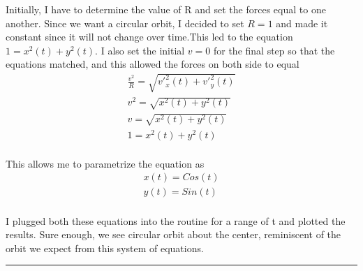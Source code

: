 \documentclass[11pt]{article}
\begin{document}
\noindent Initially, I have to determine the value of R and set the forces equal to one another. Since we want a circular orbit, I decided to set $R=1$ and made it constant since it will not change over time.This led to the equation $1=x^{2}(t)+y^{2}(t)$.  I also set the initial $v=0$ for the final step so that the equations matched, and this allowed the forces on both side to equal
\begin{eqnarray*}
\frac{v^{2}}{R} = \sqrt{v'^{2}_{x}(t)+v'^{2}_{y}(t)}\\
v^{2} = \sqrt{x^{2}(t)+y^{2}(t)}\\
v = \sqrt{x^{2}(t)+y^{2}(t)}\\
1 = x^{2}(t)+y^{2}(t)\\
\end{eqnarray*}

This allows me to parametrize the equation as
\begin{eqnarray*}
x(t) = Cos(t)\\
y(t) = Sin(t)\\
\end{eqnarray*}

I plugged both these equations into the routine for a range of t and plotted the results. Sure enough, we see circular orbit about the center, reminiscent of the orbit we expect from this system of equations.
\noindent\rule{6.5in}{0.5pt}
\end{document}
